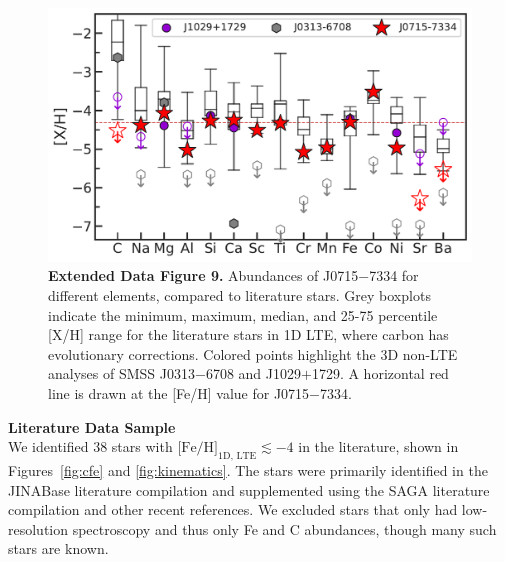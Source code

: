 \documentclass{natureprintstyle}
\newcommand{\umpstar}{J0715$-$7334\xspace}
\newcommand{\caffaustar}{J1029$+$1729\xspace}
\newcommand{\kellerstar}{SMSS J0313$-$6708\xspace}
\begin{document}
\begin{figure}
    \centering
    \includegraphics[width=\linewidth]{nature_2b_ZXH.pdf}
    \caption{\textbf{Extended Data Figure 9.} Abundances of \umpstar for different elements, compared to literature stars. Grey boxplots indicate the minimum, maximum, median, and 25-75 percentile [X/H] range for the literature stars in 1D LTE, where carbon has evolutionary corrections.
    Colored points highlight the 3D non-LTE analyses of \kellerstar\cite{Nordlander2017} and {\caffaustar}\cite{Lagae2023}.
    A horizontal red line is drawn at the [Fe/H] value for \umpstar.}
    \label{fig:boxplot}
\end{figure}


\vspace{1mm}
\noindent
{\bf Literature Data Sample}
\\
\noindent
We identified 38 stars\cite{Cayrel2004,Collet2006,Norris2007,Frebel2008,Lai2008,Cohen2008,Caffau2011,Yong2013,Keller2014,Roederer2014,Hansen2015,Placco2015,Howes2015,Bonifacio2015,Simon2015,Frebel2015,Li2015,Melendez2016,Placco2016,Caffau2016,Bonifacio2018,Starkenburg2018,Aguado2019,Frebel2019,Nordlander2019,GonzalezHernandez2020,Placco2024,Chiti2024,Skuladottir2024} with $\mbox{[Fe/H]}_{\text{1D, LTE}} \lesssim -4$ in the literature, shown in Figures~\ref{fig:cfe} and \ref{fig:kinematics}.
The stars were primarily identified in the JINABase literature compilation\cite{Abohalima2018} and supplemented using the SAGA literature compilation\cite{Suda2008} and other recent references.
We excluded stars that only had low-resolution spectroscopy and thus only Fe and C abundances, though many such stars are known\cite{Aguado2017,AllendePrieto2023}.
\end{document}
